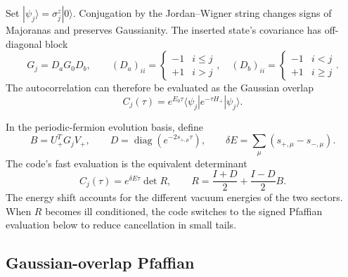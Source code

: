 \documentclass[a4paper,11pt]{article}
\begin{document}
Set $|\psi_j\rangle=\sigma_j^z|0\rangle$. Conjugation by the
Jordan--Wigner string changes signs of Majoranas and preserves Gaussianity.
The inserted state's covariance has off-diagonal block
\begin{equation}
 G_j=D_aG_0D_b,\qquad
 (D_a)_{ii}=\begin{cases}-1&i\leq j\\+1&i>j\end{cases},\quad
 (D_b)_{ii}=\begin{cases}-1&i<j\\+1&i\geq j\end{cases}.
\end{equation}
The autocorrelation can therefore be evaluated as the Gaussian overlap
\begin{equation}
 C_j(\tau)=e^{E_0\tau}
 \langle\psi_j|e^{-\tau H_{+}}|\psi_j\rangle.
\end{equation}

In the periodic-fermion evolution basis, define
\begin{equation}
 B=U_+^TG_jV_+,\qquad
 D=\operatorname{diag}(e^{-2s_{+,\mu}\tau}),\qquad
 \delta E=\sum_\mu(s_{+,\mu}-s_{-,\mu}).
\end{equation}
The code's fast evaluation is the equivalent determinant
\begin{equation}
 C_j(\tau)=e^{\delta E\tau}\det R,\qquad
 R=\frac{I+D}{2}+\frac{I-D}{2}B.
\end{equation}
The energy shift accounts for the different vacuum energies of the two
sectors. When $R$ becomes ill conditioned, the code switches to the
signed Pfaffian evaluation below to reduce cancellation in small tails.

\subsection{Gaussian-overlap Pfaffian}
\end{document}
